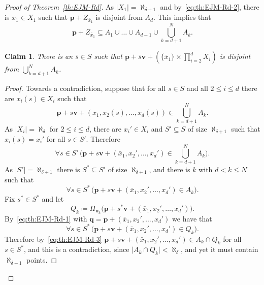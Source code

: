 \documentclass[12pt]{amsart}
\newcommand{\FORALL}[1]{\forall {#1} \, }
\newcommand{\set}[1]{\mathopen \{ {#1} \mathclose \}} %
\newcommand{\card}[1]{\mathopen | #1 \mathclose |}		%
\theoremstyle{plain}
\newtheorem{claim}{Claim}[theorem]
\theoremstyle{definition}
\theoremstyle{remark}
\begin{document}
\begin{proof}[Proof of Theorem~\ref{th:EJM-Rd}]
As \( \card{ X_1 } = \aleph_ { \delta + 1} \) and by~\eqref{eq:th:EJM-Rd-2}, there is \( \bar{x}_1 \in X_1 \) such that \( \mathbf{p} + Z_{\bar{x}_1 } \) is disjoint from \( A_d \).
This implies that 
\[ 
\mathbf{p} + Z_{ \bar{x}_1} \subseteq A_1 \cup \dots \cup A_{ d - 1 } \cup \textstyle \bigcup_{ k = d + 1 }^N A_k .
\]

\begin{claim}\label{cl:th:EJM-Rd-3}
There is an \( \bar{s} \in S \) such that \( \mathbf{p} + \bar{s} \mathbf{v} + ( \set{ \bar{x}_1 } \times \prod_{ i = 2 }^d X_i ) \) is disjoint from \( \bigcup_{ k = d + 1 }^N A_k \).
\end{claim}

\begin{proof}
Towards a contradiction, suppose that for all \( s \in S \) and all \( 2 \leq i \leq d \) there are \( x_i ( s ) \in X_i \) such that 
\[ 
 \mathbf{p} + s \mathbf{v} + ( \bar{x}_1 , x_2 ( s ) , \dots , x_d ( s ) ) \in \textstyle \bigcup_{ k = d + 1 }^N A_k .
\]
As \( \card{X_i } = \aleph_ \delta \) for \( 2 \leq i \leq d \), there are \( x_i' \in X_i \) and \( S' \subseteq S \) of size \( \aleph _{ \delta + 1 } \) such that \( x_i ( s ) = x_i ' \) for all \( s \in S ' \). 
Therefore 
\[
\FORALL{ s \in S '} \bigl ( \mathbf{p} + s \mathbf{v} + ( \bar{x}_1 , x_2 ' , \dots , x_d ' ) \in \textstyle\bigcup_{ k = d + 1 }^N A_k \bigr ) .
\] 
As \( \card{S'} = \aleph_{ \delta + 1 } \) there is \( S^* \subseteq S' \) of size \( \aleph_{ \delta + 1 } \), and there is \( k \) with \( d < k \leq N \) such that 
\begin{equation}\label{eq:th:EJM-Rd-3}
\FORALL{ s \in S ^*} \bigl ( \mathbf{p} + s \mathbf{v} + ( \bar{x}_1 , x_2 ' , \dots , x_d ' ) \in A_k \bigr ) . 
\end{equation}
Fix \( s^* \in S^* \) and let 
\[
 Q_k \coloneqq H_{\mathbf{u}_k} \bigl ( \mathbf{p} + s^* \mathbf{v} + ( \bar{x}_1 , x_2 ' , \dots , x_d ' ) \bigr ) .
\]
By~\eqref{eq:th:EJM-Rd-1} with \( \mathbf{q} = \mathbf{p} + ( \bar{x}_1 , x_2 ' , \dots , x_d ' ) \) we have that 
\[ 
\FORALL{s \in S^*}\bigl ( \mathbf{p} + s \mathbf{v} + ( \bar{x}_1 , x_2 ' , \dots , x_d ' ) \in Q_k \bigr ) .
\]
Therefore by~\eqref{eq:th:EJM-Rd-3} \( \mathbf{p} + s \mathbf{v} + ( \bar{x}_1 , x_2 ' , \dots , x_d ' ) \in A_k \cap Q_k \) for all \( s \in S^* \), and this is a contradiction, since \( \card{ A_k \cap Q_k } < \aleph_ \delta \), and yet it must contain \( \aleph_{ \delta + 1 } \) points.
\end{proof}


\end{proof}
\end{document}
